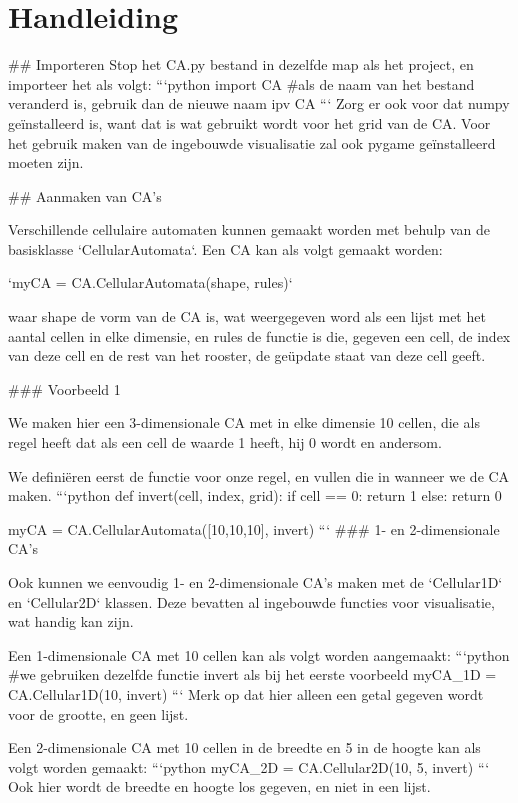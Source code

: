 \documentclass{article}
\begin{document}
\section{Handleiding}
\begin{markdown}


## Importeren
Stop het CA.py bestand in dezelfde map als het project, en importeer het als volgt:
```python
import CA
#als de naam van het bestand veranderd is, gebruik dan de nieuwe naam ipv CA
```
Zorg er ook voor dat numpy geïnstalleerd is, want dat is wat gebruikt wordt voor het grid van de CA. Voor het gebruik maken van de ingebouwde visualisatie zal ook pygame geïnstalleerd moeten zijn.

## Aanmaken van CA's

Verschillende cellulaire automaten kunnen gemaakt worden met behulp van de basisklasse `CellularAutomata`. Een CA kan als volgt gemaakt worden:

`myCA = CA.CellularAutomata(shape, rules)`
 
waar shape de vorm van de CA is, wat weergegeven word als een lijst met het aantal cellen in elke dimensie, en rules de functie is die, gegeven een cell, de index van deze cell en de rest van het rooster, de geüpdate staat van deze cell geeft. 

### Voorbeeld 1

We maken hier een 3-dimensionale CA met in elke dimensie 10 cellen, die als regel heeft dat als een cell de waarde 1 heeft, hij 0 wordt en andersom.

We definiëren eerst de functie voor onze regel, en vullen die in wanneer we de CA maken. 
```python
def invert(cell, index, grid):
    if cell == 0:
        return 1
    else:
        return 0

myCA = CA.CellularAutomata([10,10,10], invert)
```
### 1- en 2-dimensionale CA's

Ook kunnen we eenvoudig 1- en 2-dimensionale CA's maken met de  `Cellular1D` en `Cellular2D` klassen. Deze bevatten al ingebouwde functies voor visualisatie, wat handig kan zijn.

Een 1-dimensionale CA met 10 cellen kan als volgt worden aangemaakt:
```python
#we gebruiken dezelfde functie invert als bij het eerste voorbeeld
myCA_1D = CA.Cellular1D(10, invert)
```
Merk op dat hier alleen een getal gegeven wordt voor de grootte, en geen lijst. 

Een 2-dimensionale CA met 10 cellen in de breedte en 5 in de hoogte kan als volgt worden gemaakt:
```python
myCA_2D = CA.Cellular2D(10, 5, invert)
```
Ook hier wordt de breedte en hoogte los gegeven, en niet in een lijst. 


\end{markdown}
\end{document}
